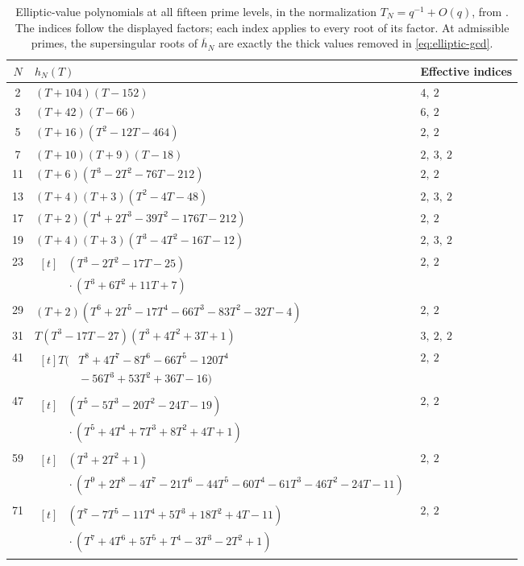 \documentclass[11pt,a4paper]{article}
\numberwithin{equation}{section}
\theoremstyle{definition}
\theoremstyle{remark}
\begin{document}
\begin{table}[p]\centering\small
\setlength{\tabcolsep}{4pt}
\begin{tabular}{cll}\toprule
$N$ & $h_N(T)$ & Effective indices\\\midrule
2 & $(T+104)(T-152)$ & $4,\ 2$\\[3pt]
3 & $(T+42)(T-66)$ & $6,\ 2$\\[3pt]
5 & $(T+16)(T^{2}-12T-464)$ & $2,\ 2$\\[3pt]
7 & $(T+10)(T+9)(T-18)$ & $2,\ 3,\ 2$\\[3pt]
11 & $(T+6)(T^{3}-2T^{2}-76T-212)$ & $2,\ 2$\\[3pt]
13 & $(T+4)(T+3)(T^{2}-4T-48)$ & $2,\ 3,\ 2$\\[3pt]
17 & $(T+2)(T^{4}+2T^{3}-39T^{2}-176T-212)$ & $2,\ 2$\\[3pt]
19 & $(T+4)(T+3)(T^{3}-4T^{2}-16T-12)$ & $2,\ 3,\ 2$\\[3pt]
23 & $\begin{aligned}[t]&(T^{3}-2T^{2}-17T-25)\\[-1pt]&{}\cdot(T^{3}+6T^{2}+11T+7)\end{aligned}$ & $2,\ 2$\\[3pt]
29 & $(T+2)(T^{6}+2T^{5}-17T^{4}-66T^{3}-83T^{2}-32T-4)$ & $2,\ 2$\\[3pt]
31 & $T(T^{3}-17T-27)(T^{3}+4T^{2}+3T+1)$ & $3,\ 2,\ 2$\\[3pt]
41 & $\begin{aligned}[t]T\bigl(&T^8+4T^7-8T^6-66T^5-120T^4\\[-1pt]&{}-56T^3+53T^2+36T-16\bigr)\end{aligned}$ & $2,\ 2$\\[3pt]
47 & $\begin{aligned}[t]&(T^{5}-5T^{3}-20T^{2}-24T-19)\\[-1pt]&{}\cdot(T^{5}+4T^{4}+7T^{3}+8T^{2}+4T+1)\end{aligned}$ & $2,\ 2$\\[3pt]
59 & $\begin{aligned}[t]&(T^{3}+2T^{2}+1)\\[-1pt]&{}\cdot(T^{9}+2T^{8}-4T^{7}-21T^{6}-44T^{5}-60T^{4}-61T^{3}-46T^{2}-24T-11)\end{aligned}$ & $2,\ 2$\\[3pt]
71 & $\begin{aligned}[t]&(T^{7}-7T^{5}-11T^{4}+5T^{3}+18T^{2}+4T-11)\\[-1pt]&{}\cdot(T^{7}+4T^{6}+5T^{5}+T^{4}-3T^{3}-2T^{2}+1)\end{aligned}$ & $2,\ 2$\\[3pt]
\bottomrule\end{tabular}
\caption{Elliptic-value polynomials at all fifteen prime levels, in the
normalization $T_N=q^{-1}+O(q)$, from \citet[\S4.2, Table~1]{JST19}.
The indices follow the displayed factors; each index applies to every root
of its factor. At admissible primes, the supersingular roots of
$\overline h_N$ are exactly the thick values removed in
\eqref{eq:elliptic-gcd}.}
\label{tab:elliptic-values}
\end{table}
\end{document}
